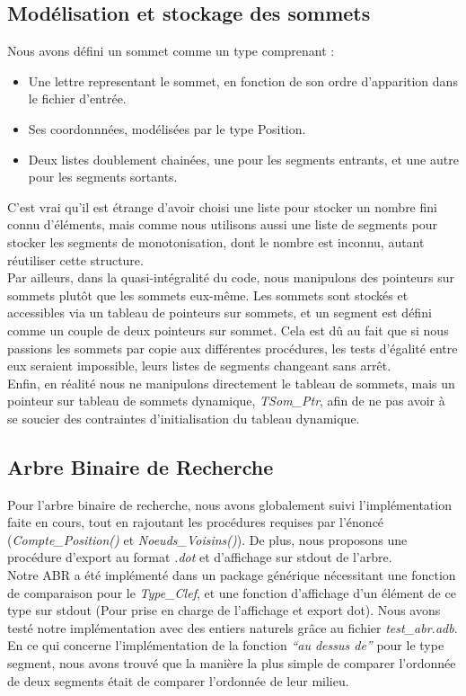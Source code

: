 \documentclass[10.9pt]{article}
\begin{document}
\subsection{Modélisation et stockage des sommets}
Nous avons défini un sommet comme un type comprenant :
\begin{itemize}
  \item Une lettre representant le sommet, en fonction de son ordre d'apparition
    dans le fichier d'entrée.
  \item Ses coordonnnées, modélisées par le type Position.
  \item Deux listes doublement chainées, une pour les segments
    entrants, et une autre pour les segments sortants.
\end{itemize}
C'est vrai qu'il est étrange d'avoir choisi une liste pour stocker un
nombre fini connu d'éléments, mais comme nous utilisons aussi une liste
de segments pour stocker les segments de monotonisation, dont le
nombre est inconnu, autant réutiliser cette structure. \\
Par ailleurs, dans la quasi-intégralité du code, nous manipulons des
pointeurs sur sommets plutôt que les sommets eux-même. Les sommets
sont stockés et accessibles via un tableau de pointeurs sur sommets,
et un segment est défini comme un couple de deux pointeurs sur
sommet. Cela est dû au fait que si nous passions les sommets par copie
aux différentes procédures, les tests d'égalité entre eux seraient
impossible, leurs listes de segments changeant sans arrêt. \\
Enfin, en réalité nous ne manipulons directement le tableau de
sommets, mais un pointeur sur tableau de sommets dynamique,
\emph{TSom\_Ptr}, afin de ne pas avoir à se soucier des contraintes
d'initialisation du tableau dynamique.

\subsection{Arbre Binaire de Recherche}
Pour l'arbre binaire de recherche, nous avons globalement suivi
l'implémentation faite en cours, tout en rajoutant les procédures
requises par l'énoncé (\emph{Compte\_Position()} et
\emph{Noeuds\_Voisins()}). De plus, nous proposons une procédure
d'export au format \emph{.dot} et d'affichage sur stdout de l'arbre.\\
Notre ABR a été implémenté dans un package générique nécessitant une
fonction de comparaison pour le \emph{Type\_Clef}, et une fonction
d'affichage d'un élément de ce type sur stdout (Pour prise en charge
de l'affichage et export dot). Nous avons testé notre implémentation
avec des entiers naturels grâce au fichier \emph{test\_abr.adb}. \\
En ce qui concerne l'implémentation de la fonction \emph{``au dessus
  de''} pour le type segment, nous avons trouvé que la manière la plus
simple de comparer l'ordonnée de deux segments était de comparer
l'ordonnée de leur milieu.
\end{document}
